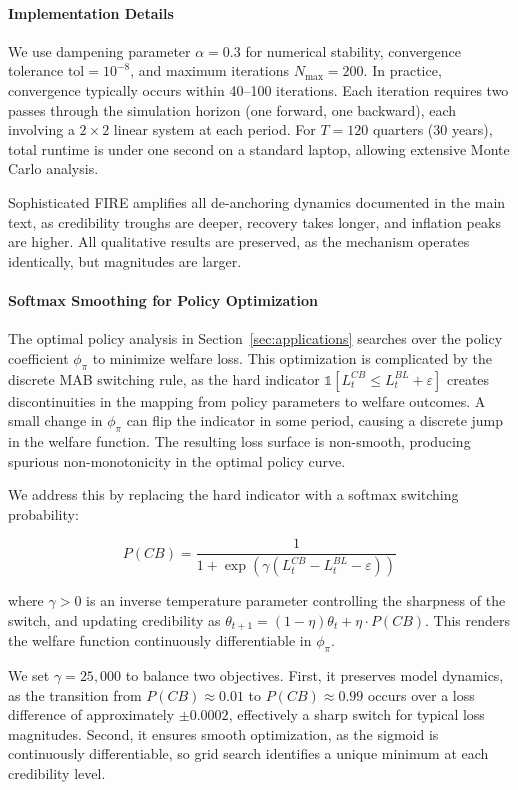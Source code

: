 \documentclass[10pt]{article}
\begin{document}
\paragraph{Implementation Details} We use dampening parameter $\alpha = 0.3$ for numerical stability, convergence tolerance $\text{tol} = 10^{-8}$, and maximum iterations $N_{\max} = 200$. In practice, convergence typically occurs within 40--100 iterations. Each iteration requires two passes through the simulation horizon (one forward, one backward), each involving a $2 \times 2$ linear system at each period. For $T = 120$ quarters (30 years), total runtime is under one second on a standard laptop, allowing extensive Monte Carlo analysis.

Sophisticated FIRE amplifies all de-anchoring dynamics documented in the main text, as credibility troughs are deeper, recovery takes longer, and inflation peaks are higher. All qualitative results are preserved, as the mechanism operates identically, but magnitudes are larger.

\paragraph{Softmax Smoothing for Policy Optimization} The optimal policy analysis in Section~\ref{sec:applications} searches over the policy coefficient $\phi_\pi$ to minimize welfare loss. This optimization is complicated by the discrete MAB switching rule, as the hard indicator $\mathds{1}[L^{CB}_t \leq L^{BL}_t + \varepsilon]$ creates discontinuities in the mapping from policy parameters to welfare outcomes. A small change in $\phi_\pi$ can flip the indicator in some period, causing a discrete jump in the welfare function. The resulting loss surface is non-smooth, producing spurious non-monotonicity in the optimal policy curve.

We address this by replacing the hard indicator with a softmax switching probability:

\begin{equation}
P(CB) = \frac{1}{1 + \exp(\gamma (L^{CB}_t - L^{BL}_t - \varepsilon))}
\end{equation}

where $\gamma > 0$ is an inverse temperature parameter controlling the sharpness of the switch, and updating credibility as $\theta_{t+1} = (1-\eta)\theta_t + \eta \cdot P(CB)$. This renders the welfare function continuously differentiable in $\phi_\pi$.

We set $\gamma = 25{,}000$ to balance two objectives. First, it preserves model dynamics, as the transition from $P(CB) \approx 0.01$ to $P(CB) \approx 0.99$ occurs over a loss difference of approximately $\pm 0.0002$, effectively a sharp switch for typical loss magnitudes. Second, it ensures smooth optimization, as the sigmoid is continuously differentiable, so grid search identifies a unique minimum at each credibility level. 
\end{document}
